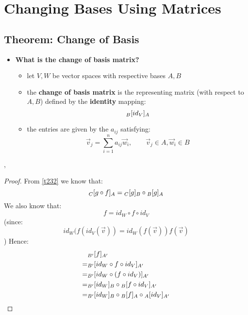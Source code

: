 \documentclass{exam}
\begin{document}
\section{Changing Bases Using Matrices}

\subsection{Theorem: Change of Basis}

\begin{itemize}
    \item \textbf{What is the change of basis matrix?}
    \begin{itemize}
        \item let $V,W$ be vector spaces with respective bases $A,B$
        \item the \textbf{change of basis matrix} is the representing matrix (with respect to $A,B$) defined by the \textbf{identity} mapping:
        \[
        \cript{id_V}{B}{A}
        \]
        \item the entries are given by the $a_{ij}$ satisfying:
        \[
        \vec{v}_j = \sum_{i = 1}^{n} a_{ij}\vec{w}_i, \qquad \vec{v}_j \in A, \vec{w}_i \in B
        \]
    \end{itemize}
\end{itemize}

\sep 

\label{t243}

\begin{proof}

From \eqref{t232} we know that:
\[
\cript{g \circ f}{C}{A} = \cript{g}{C}{B} \circ \cript{g}{B}{A}
\]
We also know that:
\[
f = id_W \circ f \circ id_V
\]
(since:
\[
id_W(f(id_V(\vec{v})) = id_W(f(\vec{v}) ) f(\vec{v})
\])
Hence:
\begin{align*}
    &\cript{f}{B'}{A'} \\
    =& \cript{id_W \circ f \circ id_V}{B'}{A'} \\
    =& \cript{id_W \circ (f \circ id_V)}{B'}{A'} \\
    =& \cript{id_W}{B'}{B} \circ \cript{f \circ id_V}{B}{A'} \\
    =& \cript{id_W}{B'}{B} \circ \cript{f}{B}{A} \circ \cript{id_V}{A}{A'} \\
\end{align*}

\end{proof}
\end{document}
